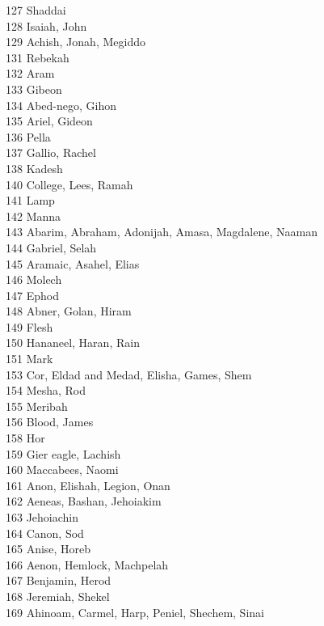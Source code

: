 127 \quad Shaddai\\
128 \quad Isaiah, John\\
129 \quad Achish, Jonah, Megiddo\\
131 \quad Rebekah\\
132 \quad Aram\\
133 \quad Gibeon\\
134 \quad Abed-nego, Gihon\\
135 \quad Ariel, Gideon\\
136 \quad Pella\\
137 \quad Gallio, Rachel\\
138 \quad Kadesh\\
140 \quad College, Lees, Ramah\\
141 \quad Lamp\\
142 \quad Manna\\
143 \quad Abarim, Abraham, Adonijah, Amasa, Magdalene, Naaman\\
144 \quad Gabriel, Selah\\
145 \quad Aramaic, Asahel, Elias\\
146 \quad Molech\\
147 \quad Ephod\\
148 \quad Abner, Golan, Hiram\\
149 \quad Flesh\\
150 \quad Hananeel, Haran, Rain\\
151 \quad Mark\\
153 \quad Cor, Eldad and Medad, Elisha, Games, Shem\\
154 \quad Mesha, Rod\\
155 \quad Meribah\\
156 \quad Blood, James\\
158 \quad Hor\\
159 \quad Gier eagle, Lachish\\
160 \quad Maccabees, Naomi\\
161 \quad Anon, Elishah, Legion, Onan\\
162 \quad Aeneas, Bashan, Jehoiakim\\
163 \quad Jehoiachin\\
164 \quad Canon, Sod\\
165 \quad Anise, Horeb\\
166 \quad Aenon, Hemlock, Machpelah\\
167 \quad Benjamin, Herod\\
168 \quad Jeremiah, Shekel\\
169 \quad Ahinoam, Carmel, Harp, Peniel, Shechem, Sinai\\

